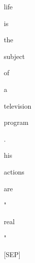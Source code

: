 \documentclass[varwidth=150mm]{standalone}
\begin{document}
\begin{CJK*}{UTF8}{gbsn}
{{{\colorbox{red!0.0}{\strut life} \colorbox{red!1.0089055299758911}{\strut is} \colorbox{red!2.982651472091675}{\strut the} \colorbox{red!0.0}{\strut subject} \colorbox{red!0.0}{\strut of} \colorbox{red!3.952474355697632}{\strut a} \colorbox{red!2.987419366836548}{\strut television} \colorbox{red!0.0}{\strut program} \colorbox{red!0.0}{\strut .} \colorbox{red!10.124005317687988}{\strut his} \colorbox{red!5.945902347564697}{\strut actions} \colorbox{red!10.195579528808594}{\strut are} \colorbox{red!2.6147515773773193}{\strut "} \colorbox{red!1.010441780090332}{\strut real} \colorbox{red!77.94158935546875}{\strut "} \colorbox{red!30.054109573364258}{\strut [SEP]}
}}}
\end{CJK*}
\end{document}
